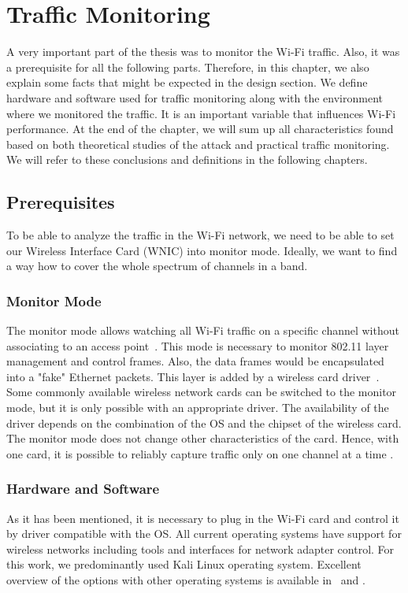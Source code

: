 \chapter{Traffic Monitoring}
\label{chap:trafficMonitoring}

A very important part of the thesis was to monitor the Wi-Fi traffic. Also, it was a prerequisite for all the following parts. Therefore, in this chapter, we also explain some facts that might be expected in the design section. We define hardware and software used for traffic monitoring along with the environment where we monitored the traffic. It is an important variable that influences Wi-Fi performance. At the end of the chapter, we will sum up all characteristics found based on both theoretical studies of the attack and practical traffic monitoring. We will refer to these conclusions and definitions in the following chapters.

\section{Prerequisites}
To be able to analyze the traffic in the Wi-Fi network, we need to be able to set our Wireless Interface Card (WNIC) into monitor mode. Ideally, we want to find a way how to cover the whole spectrum of channels in a band.

\subsection{Monitor Mode}
The monitor mode allows watching all Wi-Fi traffic on a specific channel without associating to an access point~\cite{captureSetupWireshark}. This mode is necessary to monitor 802.11 layer management and control frames. Also, the data frames would be encapsulated into a "fake" Ethernet packets. This layer is added by a wireless card driver~\cite{captureSetupWireshark}. Some commonly available wireless network cards can be switched to the monitor mode, but it is only possible with an appropriate driver. The availability of the driver depends on the combination of the OS and the chipset of the wireless card. The monitor mode does not change other characteristics of the card. Hence, with one card, it is possible to reliably capture traffic only on one channel at a time \cite{captureSetupWireshark}. 

\subsection{Hardware and Software}
\label{sub:hwAndsw}
As it has been mentioned, it is necessary to plug in the Wi-Fi card and control it by driver compatible with the OS. All current operating systems have support for wireless networks including tools and interfaces for network adapter control. For this work, we predominantly used Kali Linux operating system. Excellent overview of the options with other operating systems is available in~\cite{captureSetupWireshark} and \cite{Samek_2017}.

